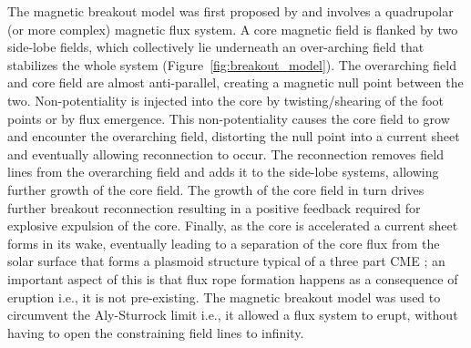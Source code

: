 The magnetic breakout model was first proposed by \citet{antiochos1999} and involves a quadrupolar (or more complex) magnetic flux system. A core magnetic field is flanked by two side-lobe fields, which collectively lie underneath an over-arching field that stabilizes the whole system (Figure~\ref{fig:breakout_model}). The overarching field and core field are almost anti-parallel, creating a magnetic null point between the two. Non-potentiality is injected into the core by twisting/shearing of the foot points or by flux emergence. This non-potentiality causes the core field to grow and encounter the overarching field, distorting the null point into a current sheet and eventually allowing reconnection to occur. The reconnection removes field lines from the overarching field and adds it to the side-lobe systems, allowing further growth of the core field. The growth of the core field in turn drives further breakout reconnection resulting in a positive feedback required for explosive expulsion of the core. Finally, as the core is accelerated a current sheet forms in its wake, eventually leading to a separation of the core flux from the solar surface that forms a plasmoid structure typical of a three part CME \citep{lynch2004}; an important aspect of this is that flux rope formation happens as a consequence of eruption i.e., it is not pre-existing. The magnetic breakout model was used to circumvent the Aly-Sturrock limit \citep{aly1991, sturrock1991} i.e., it allowed a flux system to erupt, without having to open the constraining field lines to infinity.
